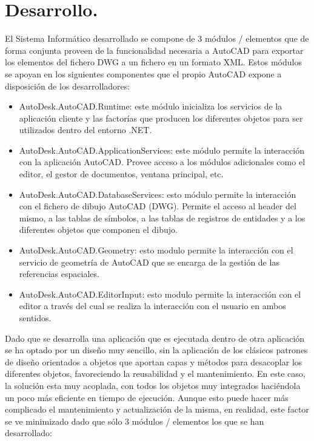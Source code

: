 \section{Desarrollo.}
El Sistema Informático desarrollado se compone de 3 módulos / elementos que de forma conjunta proveen de la funcionalidad necesaria a AutoCAD para exportar los elementos del fichero DWG a un fichero en un formato XML. Estos módulos se apoyan en los siguientes componentes que el propio AutoCAD expone a disposición de los desarrolladores:

\begin{itemize}

\item{AutoDesk.AutoCAD.Runtime: este módulo inicializa los servicios de la aplicación cliente y las factorías que producen los diferentes objetos para ser utilizados dentro del entorno .NET.}

\item{AutoDesk.AutoCAD.ApplicationServices: este módulo permite la interacción con la aplicación AutoCAD. Provee acceso a los módulos adicionales como el editor, el gestor de documentos, ventana principal, etc.}

\item{AutoDesk.AutoCAD.DatabaseServices: esto módulo permite la interacción con el fichero de dibujo AutoCAD (DWG). Permite el acceso al header del mismo, a las tablas de símbolos, a las tablas de registros de entidades y a los diferentes objetos que componen el dibujo.}

\item{AutoDesk.AutoCAD.Geometry: esto modulo permite la interacción con el servicio de geometría de AutoCAD que se encarga de la gestión de las referencias espaciales.}

\item{AutoDesk.AutoCAD.EditorInput: esto modulo permite la interacción con el editor a través del cual se realiza la interacción con el usuario en ambos sentidos.}

\end{itemize}

Dado que se desarrolla una aplicación que es ejecutada dentro de otra aplicación se ha optado por un diseño muy sencillo, sin la aplicación de los clásicos patrones de diseño orientados a objetos que aportan capas y métodos para desacoplar los diferentes objetos, favoreciendo la reusabilidad y el mantenimiento. En este caso, la solución esta muy acoplada, con todos los objetos muy integrados haciéndola un poco más eficiente en tiempo de ejecución. Aunque esto puede hacer más complicado el mantenimiento y actualización de la misma, en realidad, este factor se ve minimizado dado que sólo 3 módulos / elementos los que se han desarrollado:

